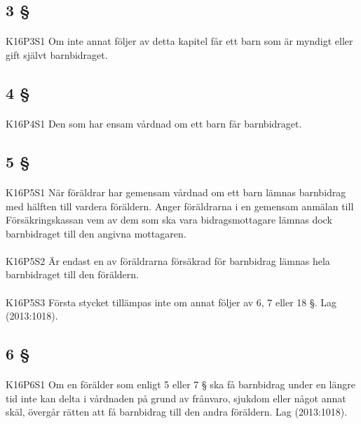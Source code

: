 \documentclass[a4paper,notitlepage,openany,10pt]{book}
\begin{document}
\subsection*{3 §}
\paragraph*{}
{\tiny K16P3S1}
Om inte annat följer av detta kapitel får ett barn som är myndigt eller gift självt barnbidraget.
\subsection*{4 §}
\paragraph*{}
{\tiny K16P4S1}
Den som har ensam vårdnad om ett barn får barnbidraget.
\subsection*{5 §}
\paragraph*{}
{\tiny K16P5S1}
När föräldrar har gemensam vårdnad om ett barn lämnas barnbidrag med hälften till vardera föräldern. Anger föräldrarna i en gemensam anmälan till Försäkringskassan vem av dem som ska vara bidragsmottagare lämnas dock barnbidraget till den angivna mottagaren.
\paragraph*{}
{\tiny K16P5S2}
Är endast en av föräldrarna försäkrad för barnbidrag lämnas hela barnbidraget till den föräldern.
\paragraph*{}
{\tiny K16P5S3}
Första stycket tillämpas inte om annat följer av 6, 7 eller 18 §.
Lag (2013:1018).
\subsection*{6 §}
\paragraph*{}
{\tiny K16P6S1}
Om en förälder som enligt 5 eller 7 § ska få barnbidrag under en längre tid inte kan delta i vårdnaden på grund av frånvaro, sjukdom eller något annat skäl, övergår rätten att få barnbidrag till den andra föräldern.
Lag (2013:1018).
\end{document}
